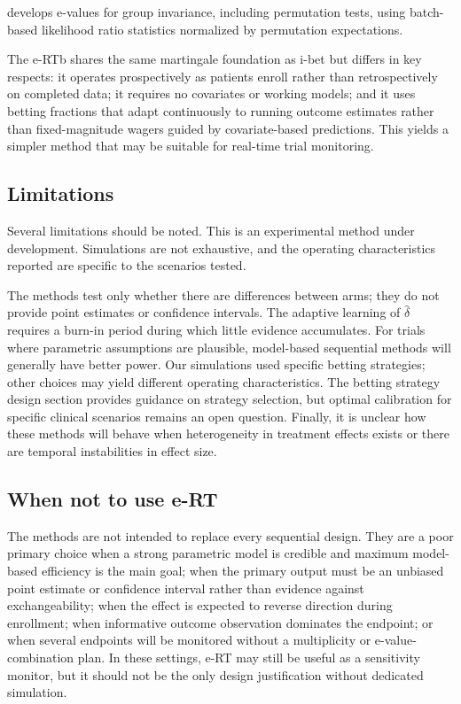 \documentclass[10pt]{article}
\begin{document}
\citet{koning2025} develops e-values for group invariance, including permutation tests, using batch-based likelihood ratio statistics normalized by permutation expectations.

The e-RTb shares the same martingale foundation as i-bet but differs in key respects: it operates prospectively as patients enroll rather than retrospectively on completed data; it requires no covariates or working models; and it uses betting fractions that adapt continuously to running outcome estimates rather than fixed-magnitude wagers guided by covariate-based predictions. This yields a simpler method that may be suitable for real-time trial monitoring.

\subsection{Limitations}

Several limitations should be noted. This is an experimental method under development. Simulations are not exhaustive, and the operating characteristics reported are specific to the scenarios tested.

The methods test only whether there are differences between arms; they do not provide point estimates or confidence intervals. The adaptive learning of $\hat{\delta}$ requires a burn-in period during which little evidence accumulates. For trials where parametric assumptions are plausible, model-based sequential methods will generally have better power. Our simulations used specific betting strategies; other choices may yield different operating characteristics. The betting strategy design section provides guidance on strategy selection, but optimal calibration for specific clinical scenarios remains an open question. Finally, it is unclear how these methods will behave when heterogeneity in treatment effects exists or there are temporal instabilities in effect size.

\subsection{When not to use e-RT}

The methods are not intended to replace every sequential design. They are a poor primary choice when a strong parametric model is credible and maximum model-based efficiency is the main goal; when the primary output must be an unbiased point estimate or confidence interval rather than evidence against exchangeability; when the effect is expected to reverse direction during enrollment; when informative outcome observation dominates the endpoint; or when several endpoints will be monitored without a multiplicity or e-value-combination plan. In these settings, e-RT may still be useful as a sensitivity monitor, but it should not be the only design justification without dedicated simulation.
\end{document}
